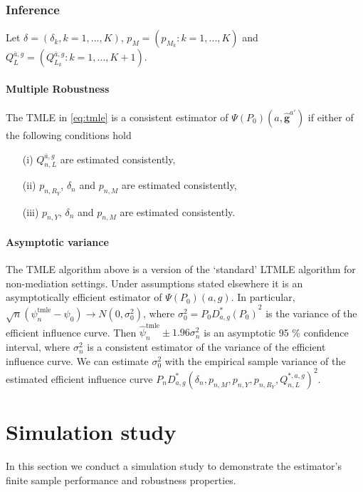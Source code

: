 \documentclass[AMA,STIX1COL]{WileyNJD-v2}
\begin{document}
\subsubsection{Inference}

Let $\delta = (\delta_k, k=1,...,K)$, $p_M = (p_{M_k}:k=1,...,K)$ and $Q_L^{\bar{a}, g}=(Q_{L_k}^{\bar{a}, g}:k=1,...,K+1)$.

\paragraph{Multiple Robustness}
The TMLE in \eqref{eq:tmle} is a consistent estimator of $\Psi(P_0)(a,\mathbf{\hat{g}}^{a'})$ if either of the following conditions hold
\begin{itemize}
    \item[(i)] $Q_{n,L}^{\bar{a}, g}$ are estimated consistently,
    \item[(ii)] $p_{n, R_Y}$, $\delta_n$ and $p_{n,M}$ are estimated consistently,
    \item[(iii)] $p_{n,Y}$, $\delta_n$ and $p_{n,M}$ are estimated consistently.
\end{itemize}

\paragraph{Asymptotic variance}
The TMLE algorithm above is a version of the `standard' LTMLE algorithm for non-mediation settings. Under assumptions stated elsewhere \cite{vdLGruber2012, Petersen2014, VdLRose2018} it is an asymptotically efficient estimator of $\Psi(P_0)(a,g)$. In particular, $\sqrt{n}(\psi_n^{\text{tmle}} - \psi_0) \to N(0, \sigma^2_0)$, where $\sigma^2_0 = P_0{D^*_{a,g}(P_0)}^2$ is the variance of the efficient influence curve. Then $\hat{\psi}_n^{\text{tmle}} \pm 1.96 \sigma^2_n$ is an asymptotic 95 \% confidence interval, where $\sigma^2_n$ is a consistent estimator of the variance of the efficient influence curve. We can estimate $\sigma^2_0$ with the empirical sample variance  of the estimated efficient influence curve  $P_n{D^*_{a,g}(\delta_n, p_{n,M}, p_{n,Y}, p_{n, R_Y}, Q^{*,a,g}_{n,L})}^2$. 

\section{Simulation study}\label{sec5}

In this section we conduct a simulation study to demonstrate the estimator's finite sample performance and robustness properties. 
\end{document}
